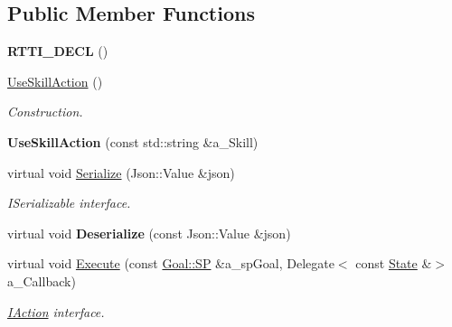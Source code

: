 \subsection*{Public Member Functions}
\begin{DoxyCompactItemize}
\item 
\mbox{\label{class_use_skill_action_a928e72bf1a6591e0508e6bc002639caa}} 
{\bfseries R\+T\+T\+I\+\_\+\+D\+E\+CL} ()
\item 
\mbox{\label{class_use_skill_action_a8e70e1842a154af84374b6ff577b8dcd}} 
\hyperlink{class_use_skill_action_a8e70e1842a154af84374b6ff577b8dcd}{Use\+Skill\+Action} ()
\begin{DoxyCompactList}\small\item\em Construction. \end{DoxyCompactList}\item 
\mbox{\label{class_use_skill_action_ab87f3c23de93b8c0460b65dc2f6ab75f}} 
{\bfseries Use\+Skill\+Action} (const std\+::string \&a\+\_\+\+Skill)
\item 
\mbox{\label{class_use_skill_action_a3d6e383c8c408e0c28fdeb40158d3123}} 
virtual void \hyperlink{class_use_skill_action_a3d6e383c8c408e0c28fdeb40158d3123}{Serialize} (Json\+::\+Value \&json)
\begin{DoxyCompactList}\small\item\em I\+Serializable interface. \end{DoxyCompactList}\item 
\mbox{\label{class_use_skill_action_a69ccc1114702f75532c1e582de4e4f43}} 
virtual void {\bfseries Deserialize} (const Json\+::\+Value \&json)
\item 
\mbox{\label{class_use_skill_action_aad5962d4cce5d3f8e5b16b19639625e8}} 
virtual void \hyperlink{class_use_skill_action_aad5962d4cce5d3f8e5b16b19639625e8}{Execute} (const \hyperlink{class_goal_a818ae12a4d1f28bd433dab2a830a390e}{Goal\+::\+SP} \&a\+\_\+sp\+Goal, Delegate$<$ const \hyperlink{struct_i_action_1_1_state}{State} \&$>$ a\+\_\+\+Callback)
\begin{DoxyCompactList}\small\item\em \hyperlink{class_i_action}{I\+Action} interface. \end{DoxyCompactList}\item 

\end{DoxyCompactItemize}
